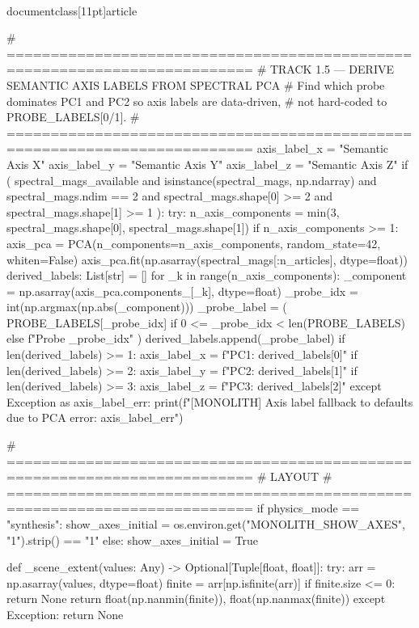 \\documentclass[11pt]{article}
\begin{document}
\begin{CodeBlock}
{{{{{{    # ==========================================================================
    # TRACK 1.5 — DERIVE SEMANTIC AXIS LABELS FROM SPECTRAL PCA
    # Find which probe dominates PC1 and PC2 so axis labels are data-driven,
    # not hard-coded to PROBE_LABELS[0/1].
    # ==========================================================================
    axis_label_x = "Semantic Axis X"
    axis_label_y = "Semantic Axis Y"
    axis_label_z = "Semantic Axis Z"
    if (
        spectral_mags_available
        and isinstance(spectral_mags, np.ndarray)
        and spectral_mags.ndim == 2
        and spectral_mags.shape[0] >= 2
        and spectral_mags.shape[1] >= 1
    ):
        try:
            n_axis_components = min(3, spectral_mags.shape[0], spectral_mags.shape[1])
            if n_axis_components >= 1:
                axis_pca = PCA(n_components=n_axis_components, random_state=42, whiten=False)
                axis_pca.fit(np.asarray(spectral_mags[:n_articles], dtype=float))
                derived_labels: List[str] = []
                for _k in range(n_axis_components):
                    _component = np.asarray(axis_pca.components_[_k], dtype=float)
                    _probe_idx = int(np.argmax(np.abs(_component)))
                    _probe_label = (
                        PROBE_LABELS[_probe_idx]
                        if 0 <= _probe_idx < len(PROBE_LABELS)
                        else f"Probe {_probe_idx}"
                    )
                    derived_labels.append(_probe_label)
                if len(derived_labels) >= 1:
                    axis_label_x = f"PC1: {derived_labels[0]}"
                if len(derived_labels) >= 2:
                    axis_label_y = f"PC2: {derived_labels[1]}"
                if len(derived_labels) >= 3:
                    axis_label_z = f"PC3: {derived_labels[2]}"
        except Exception as axis_label_err:
            print(f"[MONOLITH] Axis label fallback to defaults due to PCA error: {axis_label_err}")

    # ==========================================================================
    # LAYOUT
    # ==========================================================================
    if physics_mode == "synthesis":
        show_axes_initial = os.environ.get("MONOLITH_SHOW_AXES", "1").strip() == "1"
    else:
        show_axes_initial = True

    def _scene_extent(values: Any) -> Optional[Tuple[float, float]]:
        try:
            arr = np.asarray(values, dtype=float)
            finite = arr[np.isfinite(arr)]
            if finite.size <= 0:
                return None
            return float(np.nanmin(finite)), float(np.nanmax(finite))
        except Exception:
            return None

}}}}}}
\end{CodeBlock}
\end{document}
